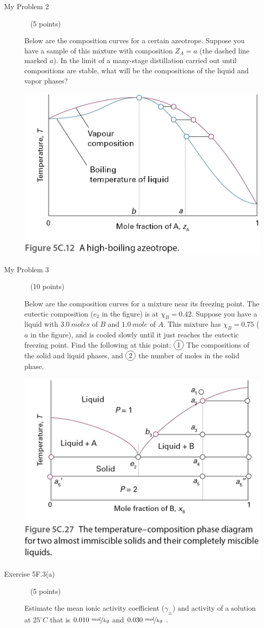 \documentclass[12pt, openany, letterpaper]{memoir}
\begin{document}
\begin{description}
	\vspace{35em}
	\item [My Problem 2] ~ (5 points)
	
	Below are the composition curves for a certain azeotrope. Suppose you have a sample of this mixture with composition $Z_A = a$ (the dashed line marked $a$). In the limit of a many-stage distillation carried out until compositions are stable, what will be the compositions of the liquid and vapor phases?
	
	\noindent\includegraphics[width=0.5\linewidth]{Azeotrope}

	\item [My Problem 3] ~ (10 points)
	
	Below are the composition curves for a mixture near its freezing point. The eutectic composition ($e_2$ in the figure) is at $\chi_B = 0.42$. Suppose you have a liquid with $3.0~moles$ of $B$ and $1.0~mole$ of $A$. This mixture has $\chi_B=0.75$ ($a$ in the figure), and is cooled slowly until it just reaches the eutectic freezing point. Find the following at this point: $\circled{1}$ The compositions of the solid and liquid phases, and $\circled{2}$ the number of moles in the solid phase.
	
	\noindent\includegraphics[width=0.5\linewidth]{Eutectic}
	\vspace{15em}
	
	\item [Exercise 5F.3(a)] ~ (5 points)
	
	Estimate the mean ionic activity coefficient ($\gamma_\pm$) and activity of a solution at $25^\circ C$ that is $0.010~\nicefrac{mol}{kg}$  and $0.030~\nicefrac{mol}{kg}$ .
	

\end{description}
\end{document}
